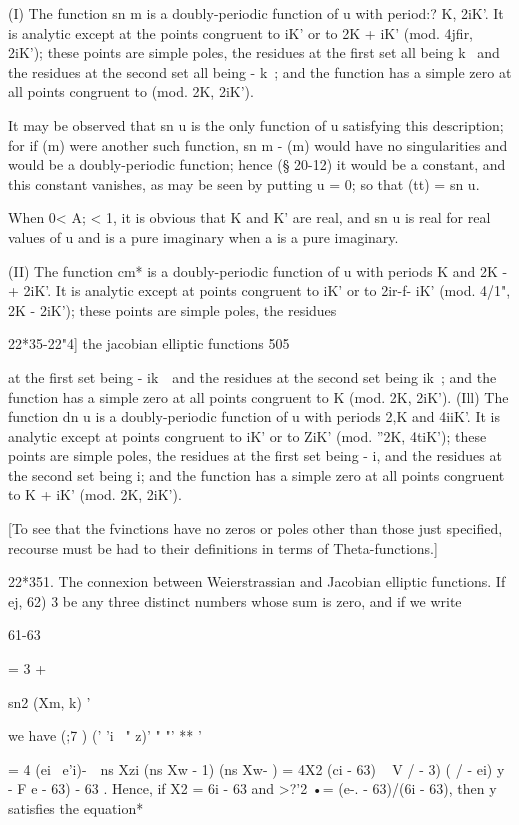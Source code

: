 (I) The function sn m is a doubly-periodic function of u with period:?
K, 2iK'. It is analytic except at the points congruent to iK' or to 2K
+ iK' (mod. 4jfir, 2iK'); these points are simple poles, the residues
at the first set all being k~ and the residues at the second set all
being - k~; and the function has a simple zero at all points
congruent to (mod. 2K, 2iK').

It may be observed that sn u is the only function of u satisfying this
description; for if (m) were another such function, sn m - (m) would
have no singularities and would be a doubly-periodic function; hence
(§ 20-12) it would be a constant, and this constant vanishes, as may
be seen by putting u = 0; so that (tt) = sn u.

When 0< A; < 1, it is obvious that K and K' are real, and sn u is real
for real values of u and is a pure imaginary when a is a pure
imaginary.

(II) The function cm* is a doubly-periodic function of u with periods
K and 2K -+ 2iK'. It is analytic except at points congruent to iK' or
to 2ir-f- iK' (mod. 4/1", 2K - 2iK'); these points are simple poles,
the residues

22*35-22"4] the jacobian elliptic functions 505

at the first set being - ik~\ and the residues at the second set being
ik~; and the function has a simple zero at all points congruent to K
(mod. 2K, 2iK'). (Ill) The function dn u is a doubly-periodic function
of u with periods 2,K and 4iiK'. It is analytic except at points
congruent to iK' or to ZiK' (mod. ''2K, 4tiK'); these points are
simple poles, the residues at the first set being - i, and the
residues at the second set being i; and the function has a simple
zero at all points congruent to K + iK' (mod. 2K, 2iK').

[To see that the fvinctions have no zeros or poles other than those
just specified, recourse must be had to their definitions in terms of
Theta-functions.]

22*351. The connexion between Weierstrassian and Jacobian elliptic
functions. If ej, 62) 3 be any three distinct numbers whose sum is
zero, and if we write

61-63

  = 3 +

sn2 (Xm, k) '

we have (;7 ) (' 'i ~" z)' " "' ** '

= 4 (ei ~e'i)-\ \ ns Xzi (ns Xw - 1) (ns Xw- ) = 4X2 (ci - 63) ~ V / -
3) ( / - ei) y - F e - 63) - 63 . Hence, if X2 = 6i - 63 and >?'2 •=
(e-. - 63)/(6i - 63), then y satisfies the equation*

